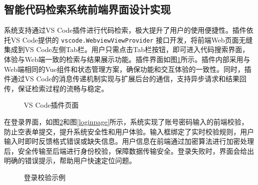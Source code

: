 \documentclass[UTF8,a4paper,12pt]{ctexart}
\numberwithin{equation}{section}
\begin{document}
\subsection{智能代码检索系统前端界面设计实现}
系统支持通过VS Code插件进行代码检索，极大提升了用户的使用便捷性。插件依托VS Code提供的 \texttt{vscode.WebviewViewProvider} 接口开发，将前端Web页面无缝集成到VS Code左侧Tab栏。用户只需点击Tab栏按钮，即可进入代码搜索界面，体验与Web端一致的检索与结果展示功能。插件界面如图\ref{vscode}所示。插件内部采用与Web端相同的Vue组件和状态管理方案，确保功能和交互体验的一致性。同时，插件通过VS Code的消息传递机制实现与扩展后台的通信，支持异步请求和结果回传，保证检索过程的流畅与稳定。
\begin{figure}[H]
	\caption{VS Code插件页面}
	\label{vscode}
\end{figure}
在登录界面，如图\ref{logincheck}和图\ref{loginpage}所示，系统实现了账号密码输入的前端校验，防止空表单提交，提升系统安全性和用户体验。输入框绑定了实时校验规则，用户输入时即时反馈格式错误或缺失信息。用户信息在前端通过加密算法进行加密处理后，安全传输至后端进行身份校验，保障数据传输安全。登录失败时，界面会给出明确的错误提示，帮助用户快速定位问题。
\begin{figure}[H]
	\caption{登录校验示例}
	\label{logincheck}
\end{figure}
\end{document}
